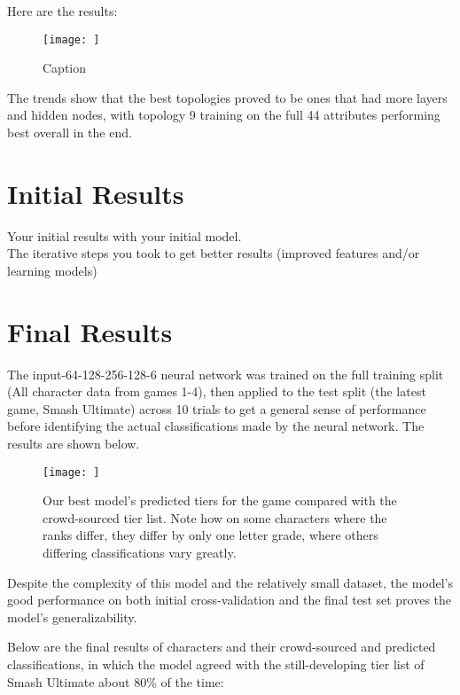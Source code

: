 \documentclass{article}
\begin{document}
Here are the results:

\begin{figure}[!htb]
    \centering
    \texttt{[image: ]}
    \caption{Caption}
    \label{fig:my_label}
\end{figure}

The trends show that the best topologies proved to be ones that had more layers and hidden nodes, with topology 9 training on the full 44 attributes performing best overall in the end.



\section{Initial Results}

Your initial results with your initial model.\\
The iterative steps you took to get better results (improved features and/or learning models)

\section{Final Results}

The input-64-128-256-128-6 neural network was trained on the full training split (All character data from games 1-4), then applied to the test split (the latest game, Smash Ultimate) across 10 trials to get a general sense of performance before identifying the actual classifications made by the neural network. The results are shown below.

\begin{figure}[!htb]
    \centering
    \texttt{[image: ]}
    \caption{Our best model's predicted tiers for the game compared with the crowd-sourced tier list. Note how on some characters where the ranks differ, they differ by only one letter grade, where others differing classifications vary greatly.}
    \label{fig:my_label}
\end{figure}

Despite the complexity of this model and the relatively small dataset, the model’s good performance on both initial cross-validation and the final test set proves the model’s generalizability.

Below are the final results of characters and their crowd-sourced and predicted classifications, in which the model agreed with the still-developing tier list of Smash Ultimate about 80\% of the time:
\end{document}

